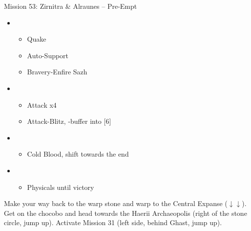\begin{battle}{Mission 53: Zirnitra \& Alraunes -- Pre-Empt}
	\begin{itemize}
		\item \third
			\begin{itemize}
				\item Quake
				\item Auto-Support
				\item Bravery-Enfire Sazh
			\end{itemize}
		\item \second
			\begin{itemize}
				\item Attack x4
				\item Attack-Blitz, \rav-buffer into [6]
			\end{itemize}
		\item \sixth
			\begin{itemize}
				\item Cold Blood, shift towards the end
			\end{itemize}
		\item \fourth
			\begin{itemize}
				\item Physicals until victory
			\end{itemize}
	\end{itemize}
\end{battle}

Make your way back to the warp stone and warp to the Central Expanse ($\downarrow\downarrow$).
Get on the chocobo and head towards the Haerii Archaeopolis (right of the stone circle, jump up).
Activate Mission 31 (left side, behind Ghast, jump up).

